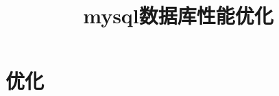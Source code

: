 \documentclass[a4paper,11pt]{article}
\title{mysql数据库性能优化}
\date{}
\begin{document}
\maketitle
\tableofcontents

\section{优化}


\end{document}
